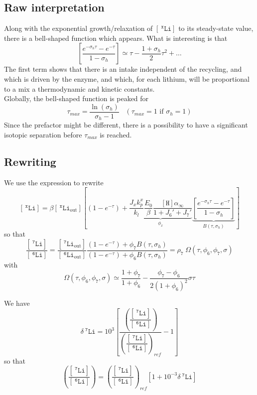 \documentclass[aps,onecolumn,11pt]{revtex4}
\newcommand{\mychem}[1]{\mathtt{#1}}
\newcommand{\myconc}[1]{\left\lbrack{#1}\right\rbrack}
\newcommand{\spLi}[1]{{~^{\mychem{#1}}\mychem{Li}}}
\newcommand{\Li}[1]{\myconc{\spLi{#1}}}
\newcommand{\spLiOut}[1]{{\spLi{#1}}_{\mathrm{out}}}
\newcommand{\LiOut}[1]{\myconc{\spLiOut{#1}}}
\newcommand{\spproton}{\mychem{H}}
\newcommand{\proton}{\myconc{\spproton}}
\newcommand{\ratioLi}{ {\left(\dfrac{\Li{7}}{\Li{6}}\right)} }
\newcommand{\deltaLi}{ {\delta\!\!\spLi{7}} }
\begin{document}
\subsection{Raw interpretation}
Along with the exponential growth/relaxation of $\Li{x}$ to its steady-state value, there is a bell-shaped function which appears.
What is interesting is that
\begin{equation}
	\left[
	 \dfrac{e^{-\sigma_h\tau} - e^{-\tau} }{1 - \sigma_h}\right] 
	 \simeq \tau - \dfrac{1+\sigma_h}{2} \tau^2 + \ldots
\end{equation}
The first term shows that there is an intake independent of the recycling, and which is driven by the enzyme, and which, for each lithium, will be proportional to a mix a thermodynamic and kinetic constants.\\
Globally, the bell-shaped function is peaked for
\begin{equation}
	\tau_{max} = \dfrac{\ln(\sigma_h)}{\sigma_h-1}\;\;\;(\tau_{max}=1 \text{ if } \sigma_h=1)
\end{equation}
Since the prefactor might be different, there is a possibility to have a significant isotopic separation before $\tau_{max}$ is reached.

\subsection{Rewriting}
We use the expression to rewrite
\begin{equation}
	\Li{x} =  \beta\LiOut{x}\left\lbrack  \left(1-e^{ -\tau }\right) + 
	\underbrace{
	\dfrac{J_x k_p^x}{k_l}
	\dfrac{E_0}{\beta}
	\dfrac{\proton \alpha_\infty}{1+J_6'+J_7'}
	}_{\phi_x}
	\underbrace{
	\left[
	 \dfrac{e^{-\sigma_h\tau} - e^{-\tau} }{1 - \sigma_h}\right]
	 }_{B\left(\tau,\sigma_h\right)}
	 \right\rbrack
\end{equation}
so that
\begin{equation}
	\dfrac{\Li{7} }{\Li{6}} = \dfrac{\LiOut{7} }{\LiOut{6}} 
	\dfrac{\left(1-e^{ -\tau }\right) + \phi_7 B\left(\tau,\sigma_h\right)}{\left(1-e^{ -\tau }\right) + \phi_6 B\left(\tau,\sigma_h\right) } 
	= \rho_7 \; \Omega\left(\tau,\phi_6,\phi_7,\sigma\right)
\end{equation}
with
\begin{equation}
	\Omega\left(\tau,\phi_6,\phi_7,\sigma\right) \simeq
	\dfrac{1+\phi_7}{1+\phi_6}
	- \dfrac{\phi_7-\phi_6}{2\left(1+\phi_6\right)^2} \sigma \tau
\end{equation}	

We have
\begin{equation}
	\delta\spLi{7} = 10^{3}\left\lbrack \dfrac{\ratioLi}{\ratioLi_{ref}} - 1\right\rbrack
\end{equation}
so that
\begin{equation}
	\ratioLi = \ratioLi_{ref} \left[ 1 + 10^{-3}  \deltaLi \right]
\end{equation}
\end{document}
